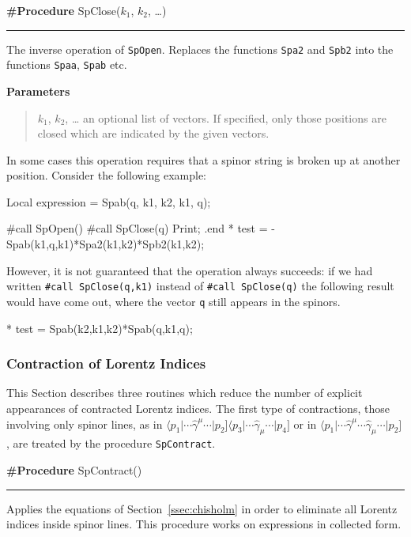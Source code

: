 \documentclass[preprint,number,12pt,sort&compress]{elsarticle}
\newcommand{\Spab}[1]{\langle #1]}
\newlength{\funcindent}
\newlength{\funcwidth}
\newenvironment{Ventry}[1]%
 {\begin{list}{}{%
   \renewcommand{\makelabel}[1]{\texttt{##1:}\hfil}%
   \settowidth{\labelwidth}{\texttt{#1:}}%
   \setlength{\leftmargin}{\labelsep}%
   \addtolength{\leftmargin}{\labelwidth}}}%
 {\end{list}}
\newenvironment{Procedure}[2]{%
\hspace{.8\funcindent}\begin{boxedminipage}{\funcwidth}
	\raggedright \textbf{\#Procedure} #1(#2)

	\vspace{-1.5ex}

	\rule{\textwidth}{0.5\fboxrule}
	\setlength{\parskip}{2ex}
}{\end{boxedminipage}}
\newenvironment{Parameters}{%
	\setlength{\parskip}{1ex}
	\textbf{Parameters}
	\vspace{-1ex}
	\begin{quote}}{%
	\end{quote}}
\begin{document}
\medskip
\begin{Procedure}{SpClose}{$k_1$, $k_2$, \dots}
The inverse operation of \texttt{SpOpen}. Replaces the functions
\texttt{Spa2} and \texttt{Spb2} into the functions \texttt{Spaa},
\texttt{Spab} etc.

	\begin{Parameters}
		\begin{Ventry}{$k_1$, $k_2$}
			\item[$k_1$, $k_2$, \dots] an optional list of vectors. If specified,
			only those positions are closed which are indicated by
			the given vectors.
		\end{Ventry}
	\end{Parameters}

\end{Procedure}
\medskip

In some cases this operation requires that a spinor string is broken up
at another position. Consider the following example:
\begin{spform}
Local expression = Spab(q, k1, k2, k1, q);

#call SpOpen()
#call SpClose(q)
Print;
.end
* test = - Spab(k1,q,k1)*Spa2(k1,k2)*Spb2(k1,k2);
\end{spform}
However, it is not guaranteed that the operation always succeeds:
if we had written \lstinline!#call SpClose(q,k1)! instead of
\lstinline!#call SpClose(q)! the following result would have
come out, where the vector \texttt{q} still appears in the spinors.
\begin{spform}
* test = Spab(k2,k1,k2)*Spab(q,k1,q);
\end{spform}

\subsubsection{Contraction of Lorentz Indices}
This Section describes three routines which reduce the number of
explicit appearances of contracted Lorentz indices. The first type
of contractions, those involving only spinor lines, as in
$\Spab{p_1\vert\cdots\hat{\gamma}^\mu\cdots\vert p_2}
\Spab{p_3\vert\cdots\hat{\gamma}_\mu\cdots\vert p_4}$
or in
$\Spab{p_1\vert\cdots\hat{\gamma}^\mu\cdots\hat{\gamma}_\mu\cdots\vert p_2}$,
are treated by the procedure \texttt{SpContract}.

\medskip
\begin{Procedure}{SpContract}{}
Applies the equations of Section~\ref{ssec:chisholm} in order to
eliminate all Lorentz indices inside spinor lines. This procedure
works on expressions in collected form.
\end{Procedure}
\medskip
\end{document}
